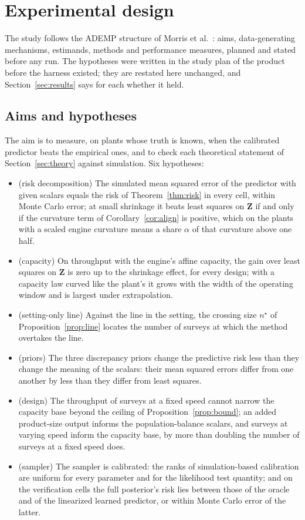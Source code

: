 \section{Experimental design}\label{sec:design}

The study follows the ADEMP structure of Morris et al.~\cite{morris}: aims, data-generating mechanisms, estimands, methods
and performance measures, planned and stated before any run. The hypotheses were written in the study plan of the product
before the harness existed; they are restated here unchanged, and Section~\ref{sec:results} says for each whether it held.

\subsection{Aims and hypotheses}

The aim is to measure, on plants whose truth is known, when the calibrated predictor beats the empirical ones, and to check
each theoretical statement of Section~\ref{sec:theory} against simulation. Six hypotheses:
\begin{itemize}
\item[H1] (risk decomposition) The simulated mean squared error of the predictor with given scalars equals the risk of
Theorem~\ref{thm:risk} in every cell, within Monte Carlo error; at small shrinkage it beats least squares on $\mathbf Z$ if and
only if the curvature term of Corollary~\ref{cor:align} is positive, which on the plants with a scaled engine curvature means
a share $\alpha$ of that curvature above one half.
\item[H2] (capacity) On throughput with the engine's affine capacity, the gain over least squares on $\mathbf Z$ is zero up to
the shrinkage effect, for every design; with a capacity law curved like the plant's it grows with the width of the operating
window and is largest under extrapolation.
\item[H3] (setting-only line) Against the line in the setting, the crossing size $n^\star$ of Proposition~\ref{prop:line}
locates the number of surveys at which the method overtakes the line.
\item[H4] (priors) The three discrepancy priors change the predictive risk less than they change the meaning of the scalars:
their mean squared errors differ from one another by less than they differ from least squares.
\item[H5] (design) The throughput of surveys at a fixed speed cannot narrow the capacity base beyond the ceiling of
Proposition~\ref{prop:bound}; an added product-size output informs the population-balance scalars, and surveys at varying
speed inform the capacity base, by more than doubling the number of surveys at a fixed speed does.
\item[H6] (sampler) The sampler is calibrated: the ranks of simulation-based calibration are uniform for every parameter and for
the likelihood test quantity; and on the verification cells the full posterior's risk lies between those of the oracle and of
the linearized learned predictor, or within Monte Carlo error of the latter.
\end{itemize}

